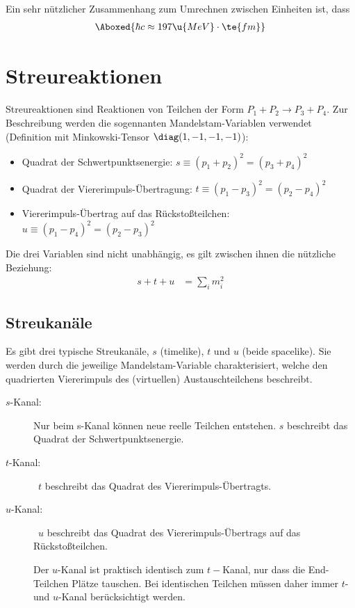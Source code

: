 \documentclass[final]{summery_5.0}
\begin{document}
Ein sehr nützlicher Zusammenhang zum Umrechnen zwischen Einheiten ist, dass
\begin{align*}
    \Aboxed{\hbar c \approx 197\u{MeV}\cdot \te{fm}}
\end{align*}

\section{Streureaktionen}
Streureaktionen sind Reaktionen von Teilchen der Form \(P_1+P_2\to P_3+P_4\). Zur Beschreibung werden die sogennanten Mandelstam-Variablen verwendet (Definition mit Minkowski-Tensor $\diag(1,-1,-1,-1)$): 
\begin{itemize}
    \item Quadrat der Schwertpunktsenergie: $s\equiv (p_1+p_2)^2 = (p_3+p_4)^2$
    \item Quadrat der Viererimpuls-Übertragung: $t\equiv (p_1-p_3)^2=(p_2-p_4)^2$
    \item Viererimpuls-Übertrag auf das Rückstoßteilchen: $u\equiv (p_1-p_4)^2 = (p_2-p_3)^2$
\end{itemize}
Die drei Variablen sind nicht unabhängig, es gilt zwischen ihnen die nützliche Beziehung:
\begin{align*}
    s+t+u &= \sum_i m_i^2
\end{align*}

\subsection{Streukanäle}
Es gibt drei typische Streukanäle, $s$ (timelike), $t$ und $u$ (beide spacelike). Sie werden durch die jeweilige Mandelstam-Variable charakterisiert, welche den quadrierten Viererimpuls des (virtuellen) Austauschteilchens beschreibt. 
\begin{description}
    \item[$s$-Kanal:] Nur beim s-Kanal können neue reelle Teilchen entstehen. $s$ beschreibt das Quadrat der Schwertpunktsenergie.
    
    \begin{figure}[H]
        \centering
        
    \end{figure}

    \item[$t$-Kanal:] \,
    $t$ beschreibt das Quadrat des Viererimpuls-Übertragts.
    \begin{figure}[H]
        \centering
        
    \end{figure}
    
    \item[$u$-Kanal:] \,
    $u$ beschreibt das Quadrat des Viererimpuls-Übertrags auf das Rückstoßteilchen.
    \begin{figure}[H]
        \centering
        
    \end{figure}
    Der $u$-Kanal ist praktisch identisch zum $t-$Kanal, nur dass die End-Teilchen Plätze tauschen. Bei identischen Teilchen müssen daher immer $t$- und $u$-Kanal berücksichtigt werden.
\end{description}
\end{document}
